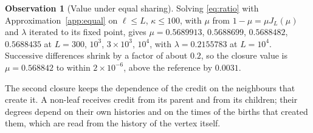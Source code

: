 \documentclass[11pt]{article}
\theoremstyle{plain}
\theoremstyle{definition}
\newtheorem{observation}[theorem]{Observation}
\theoremstyle{remark}
\begin{document}
\begin{observation}[Value under equal sharing]\label{obs:equal}
Solving \eqref{eq:ratio} with Approximation~\ref{app:equal} on $\ell\le L$, $\kappa\le100$, with $\mu$ from $1-\mu=\mu J_L(\mu)$ and $\lambda$ iterated to its fixed point, gives $\mu=0.5689913$, $0.5688699$, $0.5688482$, $0.5688435$ at $L=300$, $10^3$, $3\times10^3$, $10^4$, with $\lambda=0.2155783$ at $L=10^4$. Successive differences shrink by a factor of about $0.2$, so the closure value is $\mu=0.568842$ to within $2\times10^{-6}$, above the reference by $0.0031$.
\end{observation}

The second closure keeps the dependence of the credit on the neighbours that create it. A non-leaf receives credit from its parent and from its children; their degrees depend on their own histories and on the times of the births that created them, which are read from the history of the vertex itself.
\end{document}
